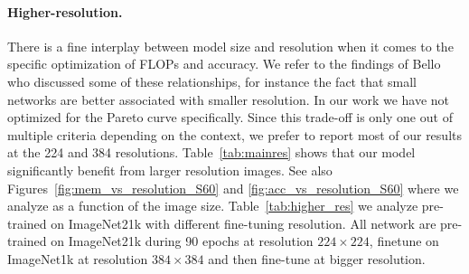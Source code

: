 \paragraph{Higher-resolution.} 
There is a fine interplay between model size and resolution when it comes to the specific optimization of FLOPs and accuracy. We refer to the findings of Bello \etal~\cite{Bello2021RevisitingRI} who discussed some of these relationships, for instance the fact that small networks are better associated with smaller resolution. In our work we have not  optimized for the Pareto curve specifically. Since this trade-off is only one out of multiple criteria depending on the context, we prefer to report most of our results at the 224 and 384 resolutions. Table~\ref{tab:mainres} shows that our model significantly benefit from larger resolution images. See also Figures~\ref{fig:mem_vs_resolution_S60}  and \ref{fig:acc_vs_resolution_S60} where we analyze \ournet as a function of the image size. 
Table~\ref{tab:higher_res} we analyze \ournet pre-trained on ImageNet21k with different fine-tuning resolution. All network are pre-trained on ImageNet21k during 90 epochs at resolution $224\times 224$, finetune on ImageNet1k at resolution $384\times 384$ and then fine-tune at bigger resolution. 
 
